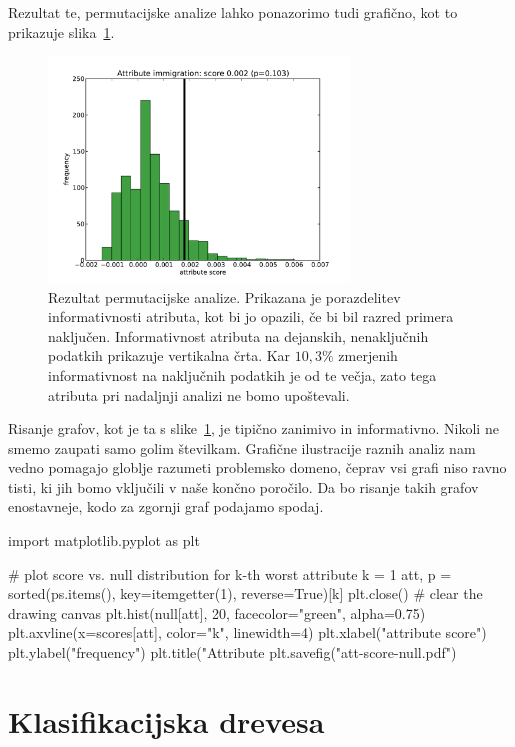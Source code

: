 Rezultat te, permutacijske analize lahko ponazorimo tudi grafično, kot to prikazuje slika~\ref{f-att-score-null}.

\begin{figure}[htbp]
\begin{center}
\includegraphics[width=8cm]{slike/att-score-null.pdf}
\caption{Rezultat permutacijske analize. Prikazana je porazdelitev informativnosti atributa, kot bi jo opazili, če bi bil razred primera naključen. Informativnost atributa na dejanskih, nenaključnih podatkih prikazuje vertikalna črta. Kar $10,3\%$ zmerjenih informativnost na naključnih podatkih je od te večja, zato tega atributa pri nadaljnji analizi ne bomo upoštevali.}
\label{f-att-score-null}
\end{center}
\end{figure}

Risanje grafov, kot je ta s slike~\ref{f-att-score-null}, je tipično zanimivo in informativno. Nikoli ne smemo zaupati samo golim številkam. Grafične ilustracije raznih analiz nam vedno pomagajo globlje razumeti problemsko domeno, čeprav vsi grafi niso ravno tisti, ki jih bomo vključili v naše končno poročilo. Da bo risanje takih grafov enostavneje, kodo za zgornji graf podajamo spodaj.

\begin{python}
import matplotlib.pyplot as plt

# plot score vs. null distribution for k-th worst attribute
k = 1
att, p = sorted(ps.items(), key=itemgetter(1), reverse=True)[k]
plt.close() # clear the drawing canvas
plt.hist(null[att], 20, facecolor="green", alpha=0.75)
plt.axvline(x=scores[att], color="k", linewidth=4)
plt.xlabel("attribute score")
plt.ylabel("frequency")
plt.title("Attribute %
plt.savefig("att-score-null.pdf")
\end{python}

\section{Klasifikacijska drevesa}

